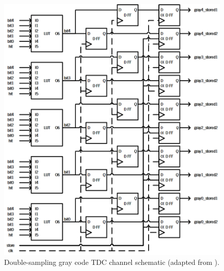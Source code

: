 \begin{figure}[ht!]
	\centering
	\includegraphics[width=.55\textwidth]{img/02_StateofArt/gray_code_simao.png}
	\caption{Double-sampling gray code TDC channel schematic (adapted from \citep{gray_code_araujo}).}
	\label{fig:gray_code_simao}
\end{figure}

\label{sub:gray_code}

